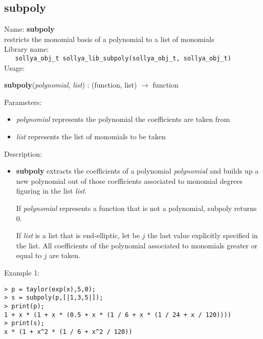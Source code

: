 \subsection{subpoly}
\label{labsubpoly}
\noindent Name: \textbf{subpoly}\\
\phantom{aaa}restricts the monomial basis of a polynomial to a list of monomials\\[0.2cm]
\noindent Library name:\\
\verb|   sollya_obj_t sollya_lib_subpoly(sollya_obj_t, sollya_obj_t)|\\[0.2cm]
\noindent Usage: 
\begin{center}
\textbf{subpoly}(\emph{polynomial}, \emph{list}) : (\textsf{function}, \textsf{list}) $\rightarrow$ \textsf{function}\\
\end{center}
Parameters: 
\begin{itemize}
\item \emph{polynomial} represents the polynomial the coefficients are taken from
\item \emph{list} represents the list of monomials to be taken
\end{itemize}
\noindent Description: \begin{itemize}

\item \textbf{subpoly} extracts the coefficients of a polynomial \emph{polynomial} and builds up a
   new polynomial out of those coefficients associated to monomial degrees figuring in
   the list \emph{list}. 
    
   If \emph{polynomial} represents a function that is not a polynomial, subpoly returns 0.
    
   If \emph{list} is a list that is end-elliptic, let be $j$ the last value explicitly specified
   in the list. All coefficients of the polynomial associated to monomials greater or
   equal to $j$ are taken.
\end{itemize}
\noindent Example 1: 
\begin{center}\begin{minipage}{15cm}\begin{Verbatim}[frame=single,commandchars=\\\|\~]
> p = taylor(exp(x),5,0);
> s = subpoly(p,[|1,3,5|]);
> print(p);
1 + x * (1 + x * (0.5 + x * (1 / 6 + x * (1 / 24 + x / 120))))
> print(s);
x * (1 + x^2 * (1 / 6 + x^2 / 120))
\end{Verbatim}
\end{minipage}\end{center}
